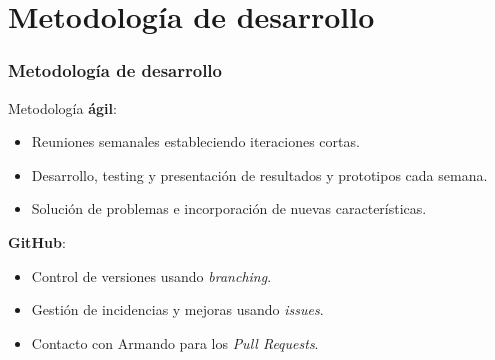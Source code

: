 \documentclass{beamer}
\begin{document}

\section{Metodología de desarrollo}
\begin{frame}
  \frametitle{Metodología de desarrollo}
  
  Metodología {\bfseries ágil}:
  \begin{itemize}
    \item Reuniones semanales estableciendo iteraciones cortas.
    \item Desarrollo, testing y presentación de resultados y prototipos cada semana.
    \item Solución de problemas e incorporación de nuevas características. 
  \end{itemize}
  \bigskip
  
  {\bfseries GitHub}:
  \begin{itemize}
    \item Control de versiones usando \textit{branching}.
    \item Gestión de incidencias y mejoras usando \textit{issues}.
    \item Contacto con Armando para los \textit{Pull Requests}.
  \end{itemize}
\end{frame}

\end{document}
